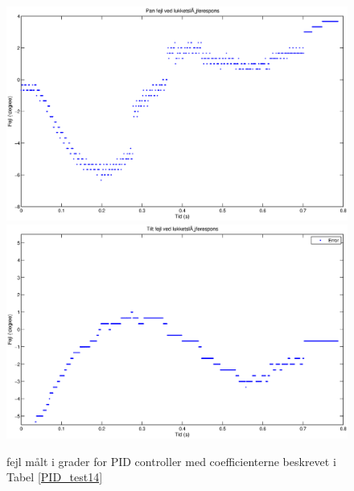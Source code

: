 \begin{figure}
\includegraphics[width=1\textwidth]{./graphics/error_pan.eps}
\includegraphics[width=1\textwidth]{./graphics/error_tilt.eps}
\caption{fejl målt i grader for PID controller med coefficienterne beskrevet i Tabel \ref{PID_test14} \label{PID_test14_plot} }
\end{figure}

